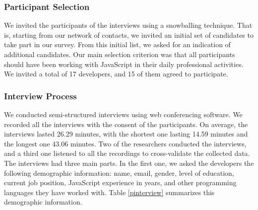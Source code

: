 \subsubsection*{Participant Selection} We invited the participants of the interviews using a snowballing technique. That is, starting from our network of contacts, we invited an initial set of candidates to take part in our survey. From this initial list, we asked for an indication of additional candidates. Our main selection criterion was that all participants should have been working with JavaScript in their daily professional activities. We invited a total of 17 developers, and 15 of them agreed to participate.   


\subsubsection*{Interview Process} We conducted semi-structured interviews using web conferencing software. We recorded all the interviews with the consent of the participants. On average, the interviews lasted 26.29 minutes, with the shortest one lasting 14.59 minutes and the longest one 43.06 minutes. 
Two of the researchers conducted the interviews, and a third one listened to all the recordings to cross-validate the collected data.
The interviews had three main parts. In the first one, we asked the developers the following demographic information: name, email, gender, level of education, current job position, JavaScript experience in years, and other programming languages they have worked with.
Table \ref{pinterview} summarizes this demographic information.

